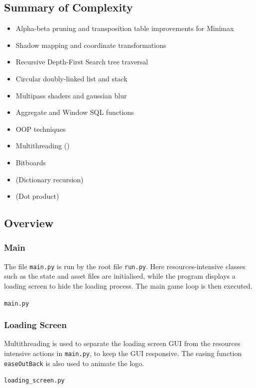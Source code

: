 \documentclass[../main/main.tex]{subfiles}
\begin{document}
\subsection{Summary of Complexity}
\begin{itemize}
\item Alpha-beta pruning and transposition table improvements for Minimax
\item Shadow mapping and coordinate transformations
\item Recursive Depth-First Search tree traversal
\item Circular doubly-linked list and stack
\item Multipass shaders and gaussian blur
\item Aggregate and Window SQL functions
\item OOP techniques
\item Multithreading ()
\item Bitboards
\item (Dictionary recursion)
\item (Dot product)
\end{itemize}

\subsection{Overview}

\subsubsection{Main}
The file \lstinline{main.py} is run by the root file \lstinline{run.py}. Here resources-intensive classes such as the state and asset files are initialised, while the program displays a loading screen to hide the loading process. The main game loop is then executed.

\noindent\verb|main.py|


\subsubsection{Loading Screen}
\label{sec:loading_screen}
Multithreading is used to separate the loading screen GUI from the resources intensive actions in \lstinline{main.py}, to keep the GUI responsive. The easing function \lstinline{easeOutBack} is also used to animate the logo.

\noindent\verb|loading_screen.py|

\end{document}
